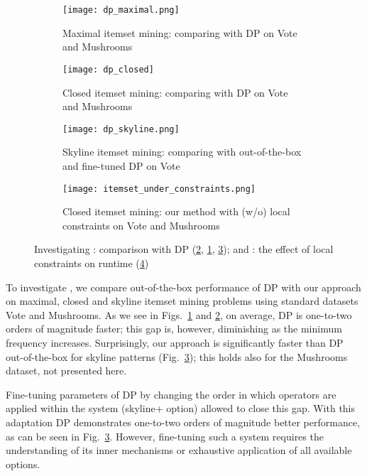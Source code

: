 {\begin{figure}[tb]
  \centering
  \begin{subfigure}[t]{0.49\textwidth}
   \texttt{[image: dp\_maximal.png]}
   \caption{Maximal itemset mining: comparing with DP on Vote and Mushrooms}
    \label{fig:dp_maximal}
  \end{subfigure}
 \hfill
  \begin{subfigure}[t]{0.49\textwidth}
   \texttt{[image: dp\_closed]}
   \caption{Closed itemset mining: comparing with DP on Vote and Mushrooms}
    \label{fig:dp_closed}
  \end{subfigure}
 \hfill
  \begin{subfigure}[t]{0.49\textwidth}
   \texttt{[image: dp\_skyline.png]}
   \caption{Skyline itemset mining: comparing with out-of-the-box and fine-tuned DP on Vote}
    \label{fig:dp_skyline}
  \end{subfigure}
\hfill
  \begin{subfigure}[t]{0.49\textwidth}
   \texttt{[image: itemset\_under\_constraints.png]}
   \caption{Closed itemset mining: our method with (w/o) local constraints on Vote and Mushrooms}%
    \label{fig:local_constraints}
  \end{subfigure}
  \caption{Investigating \qtwo: comparison with DP \parencite{dp2013} (\ref{fig:dp_closed}, \ref{fig:dp_maximal}, \ref{fig:dp_skyline}); and \qthree: the effect of local constraints on runtime (\ref{fig:local_constraints})}
  \label{fig:qtwo_three}
\end{figure}


To investigate \qtwo, we compare out-of-the-box performance of DP \parencite{dp2013} with our approach on maximal, closed and skyline itemset mining problems using standard datasets Vote and Mushrooms. As we see in Figs.~\ref{fig:dp_maximal} and \ref{fig:dp_closed}, on average, DP is one-to-two orders of magnitude faster; this gap is, however, diminishing as the minimum frequency increases. %
Surprisingly, our approach is significantly faster than DP out-of-the-box for skyline patterns (Fig.~\ref{fig:dp_skyline}); this holds also for the Mushrooms dataset, not presented here. 

Fine-tuning parameters of DP by changing the order in which operators are applied within the system (skyline+ option) allowed to close this gap. With this adaptation DP demonstrates one-to-two orders of magnitude better performance, as can be seen in Fig.~\ref{fig:dp_skyline}. However, fine-tuning such a system requires the understanding of its inner mechanisms or exhaustive application of all available options. 

}
